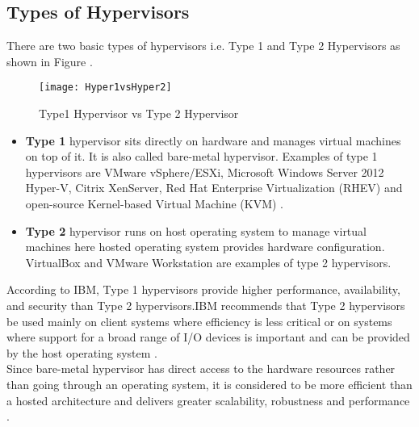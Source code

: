\subsection{Types of Hypervisors\label{sec:bbb}}
There are two basic types of hypervisors i.e. Type 1 and Type 2 Hypervisors as shown in Figure \cite{Hyper1vsHyper2}.
\begin{figure}[htb]
	\centering
	\texttt{[image: Hyper1vsHyper2]}
	\caption{Type1 Hypervisor vs Type 2 Hypervisor}
	\label{Virtualization}
\end{figure}
\begin{itemize}
	\item \textbf{Type 1} hypervisor sits directly on hardware and manages virtual machines on top of it. It is also called bare-metal hypervisor. Examples of type 1 hypervisors are VMware vSphere/ESXi, Microsoft Windows Server 2012 Hyper-V, Citrix XenServer, Red Hat Enterprise Virtualization (RHEV) and open-source Kernel-based Virtual Machine (KVM) \cite{hypervisor2}.
	\item \textbf{Type 2} hypervisor runs on host operating system to manage virtual machines here hosted operating system provides hardware configuration.  VirtualBox and VMware
	Workstation are examples of type 2 hypervisors.
\end{itemize}
According to IBM, Type 1 hypervisors provide higher performance, availability, and security than Type 2 hypervisors.IBM recommends that Type 2 hypervisors be used mainly on client systems where efficiency is less critical or on systems where support for a broad range of I/O devices is important and can be provided by the host operating system \cite{searchservervirtualization}.
\\
Since bare-metal hypervisor has direct access to the hardware resources rather than going through
an operating system, it is considered to be more efficient than a hosted architecture and delivers greater scalability, robustness and performance \cite{hypervisor1}. 

